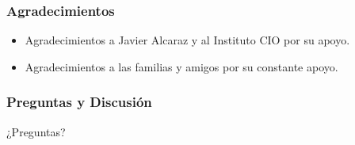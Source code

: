 \documentclass{beamer}
\begin{document}
\begin{frame}
    \frametitle{Agradecimientos}
    \begin{itemize}
        \item Agradecimientos a Javier Alcaraz y al Instituto CIO por su apoyo.
        \item Agradecimientos a las familias y amigos por su constante apoyo.
    \end{itemize}
\end{frame}

\begin{frame}
    \frametitle{Preguntas y Discusión}
    \begin{center}
        \large{¿Preguntas?}
    \end{center}
\end{frame}
\end{document}
